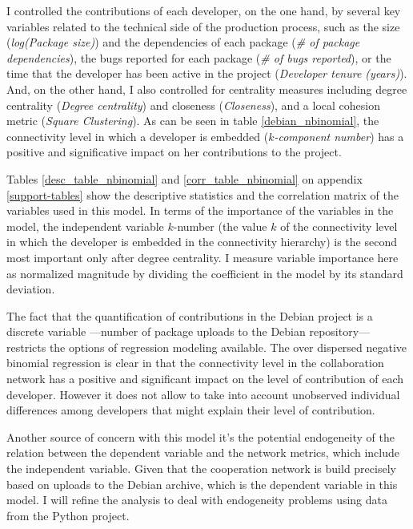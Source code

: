 I controlled the contributions of each developer, on the one hand, by several key variables related to the technical side of the production process, such as the size (\emph{log(Package size)}) and the dependencies of each package (\emph{\# of package dependencies}), the bugs reported for each package (\emph{\# of bugs reported}), or the time that the developer has been active in the project (\emph{Developer tenure (years)}). And, on the other hand, I also controlled for centrality measures including degree centrality (\emph{Degree centrality}) and closeness (\emph{Closeness}), and a local cohesion metric (\emph{Square Clustering}). As can be seen in table \ref{debian_nbinomial}, the connectivity level in which a developer is embedded (\emph{$k$-component number}) has a positive and significative impact on her contributions to the project.



Tables \ref{desc_table_nbinomial} and \ref{corr_table_nbinomial} on appendix \ref{support-tables} show the descriptive statistics and the correlation matrix of the variables used in this model. In terms of the importance of the variables in the model, the independent variable $k$-number (the value $k$ of the connectivity level in which the developer is embedded in the connectivity hierarchy) is the second most important only after degree centrality. I measure variable importance here as normalized magnitude by dividing the coefficient in the model by its standard deviation.
 
The fact that the quantification of contributions in the Debian project is a discrete variable ---number of package uploads to the Debian repository--- restricts the options of regression modeling available. The over dispersed negative binomial regression is clear in that the connectivity level in the collaboration network has a positive and significant impact on the level of contribution of each developer. However it does not allow to take into account unobserved individual differences among developers that might explain their level of contribution.

Another source of concern with this model it's the potential endogeneity of the relation between the dependent variable and the network metrics, which include the independent variable. Given that the cooperation network is build precisely based on uploads to the Debian archive, which is the dependent variable in this model. I will refine the analysis to deal with endogeneity problems using data from the Python project. 

